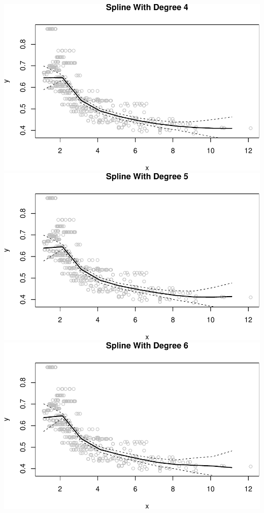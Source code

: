 \documentclass[]{article}
\begin{document}
\includegraphics{hw7_files/figure-latex/unnamed-chunk-10-4.pdf}
\includegraphics{hw7_files/figure-latex/unnamed-chunk-10-5.pdf}
\includegraphics{hw7_files/figure-latex/unnamed-chunk-10-6.pdf}
\end{document}
